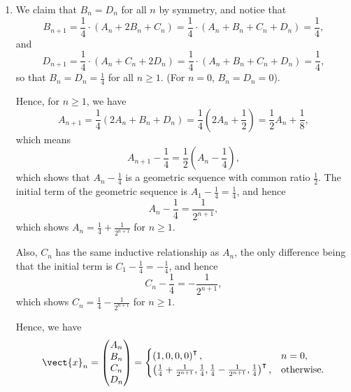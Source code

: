 \begin{enumerate}
    \item We claim that \(B_n = D_n\) for all \(n\) by symmetry, and notice that
          \[
              B_{n + 1} = \frac{1}{4} \cdot (A_n + 2 B_n + C_n) = \frac{1}{4} \cdot (A_n + B_n + C_n + D_n) = \frac{1}{4},
          \]
          and
          \[
              D_{n + 1} = \frac{1}{4} \cdot (A_n + C_n + 2 D_n) = \frac{1}{4} \cdot (A_n + B_n + C_n + D_n) = \frac{1}{4},
          \]
          so that \(B_n = D_n = \frac{1}{4}\) for all \(n \geq 1\). (For \(n = 0\), \(B_n = D_n = 0\)).

          Hence, for \(n \geq 1\), we have
          \[
              A_{n + 1} = \frac{1}{4} (2 A_n + B_n + D_n) = \frac{1}{4} \left(2 A_n + \frac{1}{2}\right) = \frac{1}{2} A_n + \frac{1}{8},
          \]
          which means
          \[
              A_{n + 1} - \frac{1}{4} = \frac{1}{2} \left(A_n - \frac{1}{4}\right),
          \]
          which shows that \(A_n - \frac{1}{4}\) is a geometric sequence with common ratio \(\frac{1}{2}\). The initial term of the geometric sequence is \(A_1 - \frac{1}{4} = \frac{1}{4}\), and hence
          \[
              A_n - \frac{1}{4} = \frac{1}{2^{n + 1}},
          \]
          which shows \(A_n = \frac{1}{4} + \frac{1}{2^{n + 1}}\) for \(n \geq 1\).

          Also, \(C_n\) has the same inductive relationship as \(A_n\), the only difference being that the initial term is \(C_1 - \frac{1}{4} = -\frac{1}{4}\), and hence
          \[
              C_n - \frac{1}{4} = -\frac{1}{2^{n + 1}},
          \]
          which shows \(C_n = \frac{1}{4} - \frac{1}{2^{n + 1}}\) for \(n \geq 1\).

          Hence, we have
          \[
              \vect{x}_n = \begin{pmatrix}
                  A_n \\
                  B_n \\
                  C_n \\
                  D_n
              \end{pmatrix} = \begin{cases}
                  \left(
                  1, 0, 0, 0
                  \right)^\intercal, & n = 0,            \\
                  \left(
                  \frac{1}{4} + \frac{1}{2^{n + 1}}, \frac{1}{4}, \frac{1}{4} - \frac{1}{2^{n + 1}}, \frac{1}{4}
                  \right)^\intercal, & \text{otherwise.}
              \end{cases}
          \]
\end{enumerate}